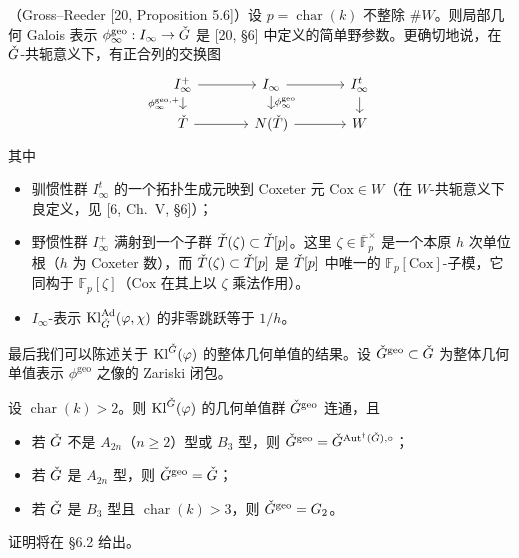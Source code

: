 \begin{corollary}
（Gross--Reeder [20, Proposition 5.6]）设 $p=\operatorname{char}(k)$ 不整除 $\#W$。则局部几何 Galois 表示 $\phi^{\mathrm{geo}}_\infty:I_\infty\to\check G$ 是 [20, §6] 中定义的简单野参数。更确切地说，在 $\check G$-共轭意义下，有正合列的交换图
\[
\begin{tikzcd}[column sep=large, row sep=small]
I^+_\infty \arrow[r] \arrow[d, "\phi^{\mathrm{geo},+}_\infty"'] & I_\infty \arrow[r] \arrow[d, "\phi^{\mathrm{geo}}_\infty"] & I^t_\infty \arrow[d] \\
\ckT \arrow[r] & N(\ckT) \arrow[r] & W
\end{tikzcd}
\]
其中
\begin{itemize}[leftmargin=1.6em, itemsep=.2em]
\item 驯惯性群 $I^t_\infty$ 的一个拓扑生成元映到 Coxeter 元 $\mathrm{Cox}\in W$（在 $W$-共轭意义下良定义，见 [6, Ch.~V, §6]）；
\item 野惯性群 $I^+_\infty$ 满射到一个子群 $\check T(\zeta)\subset\check T[p]$。这里 $\zeta\in\overline{\mathbb{F}}_p^\times$ 是一个本原 $h$ 次单位根（$h$ 为 Coxeter 数），而 $\check T(\zeta)\subset\check T[p]$ 是 $\check T[p]$ 中唯一的 $\mathbb{F}_p[\mathrm{Cox}]$-子模，它同构于 $\mathbb{F}_p[\zeta]$（$\mathrm{Cox}$ 在其上以 $\zeta$ 乘法作用）。
\item $I_\infty$-表示 $\mathrm{Kl}^{\mathrm{Ad}}_{\check G}(\varphi,\chi)$ 的非零跳跃等于 $1/h$。
\end{itemize}
\end{corollary}

最后我们可以陈述关于 $\mathrm{Kl}^{\check G}(\varphi)$ 的整体几何单值的结果。设 $\check G^{\mathrm{geo}}\subset\check G$ 为整体几何单值表示 $\phi^{\mathrm{geo}}$ 之像的 Zariski 闭包。

\begin{mainthm}[3]
设 $\operatorname{char}(k)>2$。则 $\mathrm{Kl}^{\check G}(\varphi)$ 的几何单值群 $\check G^{\mathrm{geo}}$ 连通，且
\begin{itemize}[leftmargin=1.6em, itemsep=.2em]
\item 若 $\check G$ 不是 $A_{2n}$（$n\ge 2$）型或 $B_3$ 型，则 $\check G^{\mathrm{geo}}=\check G^{\operatorname{Aut}^\dagger(\check G),\circ}$；
\item 若 $\check G$ 是 $A_{2n}$ 型，则 $\check G^{\mathrm{geo}}=\check G$；
\item 若 $\check G$ 是 $B_3$ 型且 $\operatorname{char}(k)>3$，则 $\check G^{\mathrm{geo}}=G_2$。
\end{itemize}
\end{mainthm}

证明将在 §6.2 给出。


